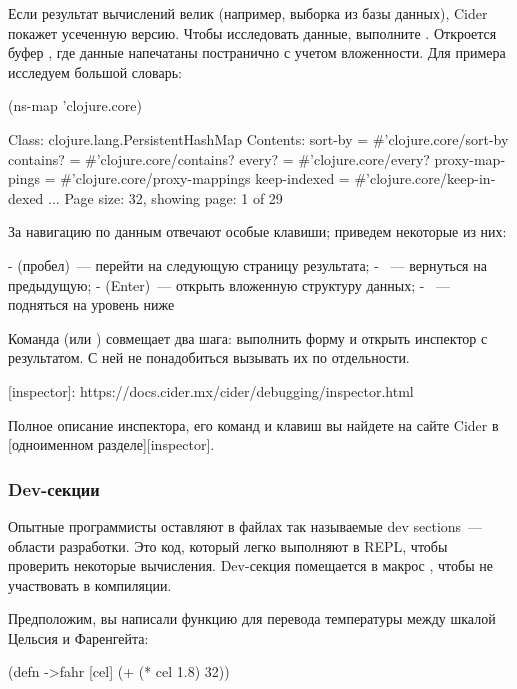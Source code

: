 Если результат вычислений велик (например, выборка из базы данных), Cider покажет усеченную версию. Чтобы исследовать данные, выполните . Откроется буфер , где данные напечатаны постранично с учетом вложенности. Для примера исследуем большой словарь:

\begin{english}
  \begin{text}
(ns-map 'clojure.core)

Class: clojure.lang.PersistentHashMap
Contents:
  sort-by = #'clojure.core/sort-by
  contains? = #'clojure.core/contains?
  every? = #'clojure.core/every?
  proxy-mappings = #'clojure.core/proxy-mappings
  keep-indexed = #'clojure.core/keep-indexed
  ...
  Page size: 32, showing page: 1 of 29
  \end{text}
\end{english}

За навигацию по данным отвечают особые клавиши; приведем некоторые из них:

-  (пробел)~--- перейти на следующую страницу результата;
- ~--- вернуться на предыдущую;
-  (Enter)~--- открыть вложенную структуру данных;
- ~--- подняться на уровень ниже

Команда  (или ) совмещает два шага: выполнить форму и открыть инспектор с результатом. С ней не понадобиться вызывать их по отдельности.

[inspector]: https://docs.cider.mx/cider/debugging/inspector.html

Полное описание инспектора, его команд и клавиш вы найдете на сайте Cider в [одноименном разделе][inspector].

\subsubsection{Dev-секции}

Опытные программисты оставляют в файлах так называемые dev sections~--- области разработки. Это код, который легко выполняют в REPL, чтобы проверить некоторые вычисления. Dev-секция помещается в макрос , чтобы не участвовать в компиляции.

Предположим, вы написали функцию  для перевода температуры между шкалой Цельсия и Фаренгейта:

\begin{english}
  \begin{clojure}
(defn ->fahr [cel]
  (+ (* cel 1.8) 32))
  \end{clojure}
\end{english}

